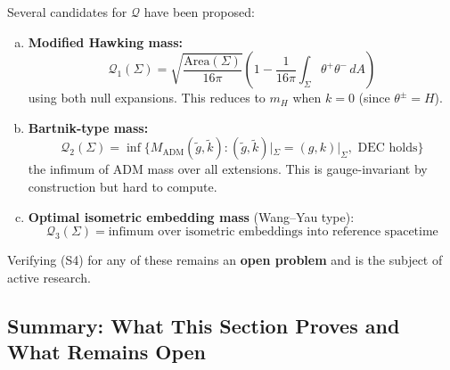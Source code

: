 \begin{remark}
Several candidates for $\mathcal{Q}$ have been proposed:
\begin{enumerate}[(a)]
\item \textbf{Modified Hawking mass:}
\[
\mathcal{Q}_1(\Sigma) = \sqrt{\frac{\mathrm{Area}(\Sigma)}{16\pi}}\left(1 - \frac{1}{16\pi}\int_\Sigma \theta^+\theta^- \, dA\right)
\]
using both null expansions. This reduces to $m_H$ when $k=0$ (since $\theta^\pm = H$).

\item \textbf{Bartnik-type mass:}
\[
\mathcal{Q}_2(\Sigma) = \inf\{M_{\mathrm{ADM}}(\tilde{g}, \tilde{k}) : (\tilde{g},\tilde{k})|_\Sigma = (g,k)|_\Sigma, \text{ DEC holds}\}
\]
the infimum of ADM mass over all extensions. This is gauge-invariant by construction but hard to compute.

\item \textbf{Optimal isometric embedding mass} (Wang--Yau type):
\[
\mathcal{Q}_3(\Sigma) = \text{infimum over isometric embeddings into reference spacetime}
\]
\end{enumerate}

Verifying (S4) for any of these remains an \textbf{open problem} and is the subject of active research.
\end{remark}

\subsection{Summary: What This Section Proves and What Remains Open}

